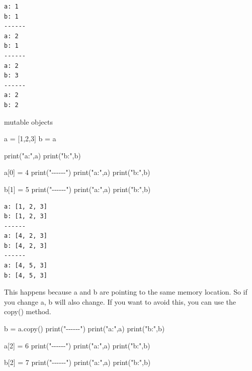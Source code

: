\documentclass[
  letterpaper,
  DIV=11,
  numbers=noendperiod]{scrreprt}
\newenvironment{Shaded}{\begin{snugshade}}{\end{snugshade}}
\newcommand{\BuiltInTok}[1]{\textcolor[rgb]{0.00,0.23,0.31}{#1}}
\newcommand{\DecValTok}[1]{\textcolor[rgb]{0.68,0.00,0.00}{#1}}
\newcommand{\NormalTok}[1]{\textcolor[rgb]{0.00,0.23,0.31}{#1}}
\newcommand{\OperatorTok}[1]{\textcolor[rgb]{0.37,0.37,0.37}{#1}}
\newcommand{\StringTok}[1]{\textcolor[rgb]{0.13,0.47,0.30}{#1}}
\begin{document}
\begin{verbatim}
a: 1
b: 1
------
a: 2
b: 1
------
a: 2
b: 3
------
a: 2
b: 2
\end{verbatim}

mutable objects

\begin{Shaded}
\begin{Highlighting}[]
\NormalTok{a }\OperatorTok{=}\NormalTok{ [}\DecValTok{1}\NormalTok{,}\DecValTok{2}\NormalTok{,}\DecValTok{3}\NormalTok{]}
\NormalTok{b }\OperatorTok{=}\NormalTok{ a}

\BuiltInTok{print}\NormalTok{(}\StringTok{"a:"}\NormalTok{,a)}
\BuiltInTok{print}\NormalTok{(}\StringTok{"b:"}\NormalTok{,b)}

\NormalTok{a[}\DecValTok{0}\NormalTok{] }\OperatorTok{=} \DecValTok{4}
\BuiltInTok{print}\NormalTok{(}\StringTok{"{-}{-}{-}{-}{-}{-}"}\NormalTok{)}
\BuiltInTok{print}\NormalTok{(}\StringTok{"a:"}\NormalTok{,a)}
\BuiltInTok{print}\NormalTok{(}\StringTok{"b:"}\NormalTok{,b)}

\NormalTok{b[}\DecValTok{1}\NormalTok{] }\OperatorTok{=} \DecValTok{5}
\BuiltInTok{print}\NormalTok{(}\StringTok{"{-}{-}{-}{-}{-}{-}"}\NormalTok{)}
\BuiltInTok{print}\NormalTok{(}\StringTok{"a:"}\NormalTok{,a)}
\BuiltInTok{print}\NormalTok{(}\StringTok{"b:"}\NormalTok{,b)}
\end{Highlighting}
\end{Shaded}

\begin{verbatim}
a: [1, 2, 3]
b: [1, 2, 3]
------
a: [4, 2, 3]
b: [4, 2, 3]
------
a: [4, 5, 3]
b: [4, 5, 3]
\end{verbatim}

This happens because a and b are pointing to the same memory location.
So if you change a, b will also change. If you want to avoid this, you
can use the copy() method.

\begin{Shaded}
\begin{Highlighting}[]
\NormalTok{b }\OperatorTok{=}\NormalTok{ a.copy()}
\BuiltInTok{print}\NormalTok{(}\StringTok{"{-}{-}{-}{-}{-}{-}"}\NormalTok{)}
\BuiltInTok{print}\NormalTok{(}\StringTok{"a:"}\NormalTok{,a)}
\BuiltInTok{print}\NormalTok{(}\StringTok{"b:"}\NormalTok{,b)}

\NormalTok{a[}\DecValTok{2}\NormalTok{] }\OperatorTok{=} \DecValTok{6}
\BuiltInTok{print}\NormalTok{(}\StringTok{"{-}{-}{-}{-}{-}{-}"}\NormalTok{)}
\BuiltInTok{print}\NormalTok{(}\StringTok{"a:"}\NormalTok{,a)}
\BuiltInTok{print}\NormalTok{(}\StringTok{"b:"}\NormalTok{,b)}

\NormalTok{b[}\DecValTok{2}\NormalTok{] }\OperatorTok{=} \DecValTok{7}
\BuiltInTok{print}\NormalTok{(}\StringTok{"{-}{-}{-}{-}{-}{-}"}\NormalTok{)}
\BuiltInTok{print}\NormalTok{(}\StringTok{"a:"}\NormalTok{,a)}
\BuiltInTok{print}\NormalTok{(}\StringTok{"b:"}\NormalTok{,b)}
\end{Highlighting}
\end{Shaded}
\end{document}
